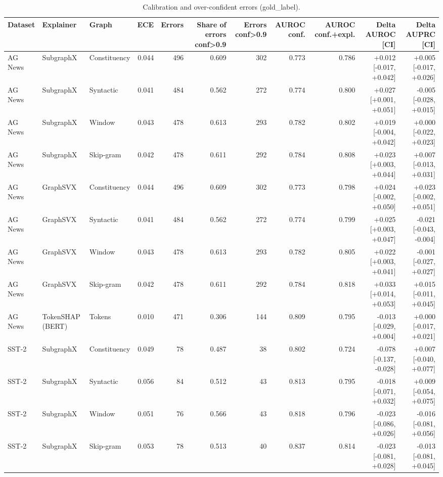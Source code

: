 \begin{table}[H]
\centering
\small
\caption{Calibration and over-confident errors (gold_label).}
\label{tab:regime_gold_label}
\begin{tabular}{lllrrrrrrrr}
\toprule
Dataset & Explainer & Graph & ECE & Errors & Share of errors conf>0.9 & Errors conf>0.9 & AUROC conf. & AUROC conf.+expl. & Delta AUROC [CI] & Delta AUPRC [CI] \\
\midrule
AG News & SubgraphX & Constituency & 0.044 & 496 & 0.609 & 302 & 0.773 & 0.786 & +0.012 [-0.017, +0.042] & +0.005 [-0.017, +0.026] \\
AG News & SubgraphX & Syntactic & 0.041 & 484 & 0.562 & 272 & 0.774 & 0.800 & +0.027 [+0.001, +0.051] & -0.005 [-0.028, +0.015] \\
AG News & SubgraphX & Window & 0.043 & 478 & 0.613 & 293 & 0.782 & 0.802 & +0.019 [-0.004, +0.042] & +0.000 [-0.022, +0.023] \\
AG News & SubgraphX & Skip-gram & 0.042 & 478 & 0.611 & 292 & 0.784 & 0.808 & +0.023 [+0.003, +0.044] & +0.007 [-0.013, +0.031] \\
AG News & GraphSVX & Constituency & 0.044 & 496 & 0.609 & 302 & 0.773 & 0.798 & +0.024 [-0.002, +0.050] & +0.023 [-0.002, +0.051] \\
AG News & GraphSVX & Syntactic & 0.041 & 484 & 0.562 & 272 & 0.774 & 0.799 & +0.025 [+0.003, +0.047] & -0.021 [-0.043, -0.004] \\
AG News & GraphSVX & Window & 0.043 & 478 & 0.613 & 293 & 0.782 & 0.805 & +0.022 [+0.003, +0.041] & -0.001 [-0.027, +0.027] \\
AG News & GraphSVX & Skip-gram & 0.042 & 478 & 0.611 & 292 & 0.784 & 0.818 & +0.033 [+0.014, +0.053] & +0.015 [-0.011, +0.045] \\
AG News & TokenSHAP (BERT) & Tokens & 0.010 & 471 & 0.306 & 144 & 0.809 & 0.795 & -0.013 [-0.029, +0.004] & +0.000 [-0.017, +0.021] \\
SST-2 & SubgraphX & Constituency & 0.049 & 78 & 0.487 & 38 & 0.802 & 0.724 & -0.078 [-0.137, -0.028] & +0.007 [-0.040, +0.077] \\
SST-2 & SubgraphX & Syntactic & 0.056 & 84 & 0.512 & 43 & 0.813 & 0.795 & -0.018 [-0.071, +0.032] & +0.009 [-0.054, +0.075] \\
SST-2 & SubgraphX & Window & 0.051 & 76 & 0.566 & 43 & 0.818 & 0.796 & -0.023 [-0.086, +0.026] & -0.016 [-0.081, +0.056] \\
SST-2 & SubgraphX & Skip-gram & 0.053 & 78 & 0.513 & 40 & 0.837 & 0.814 & -0.023 [-0.081, +0.028] & -0.013 [-0.081, +0.045] \\

\end{tabular}
\end{table}
